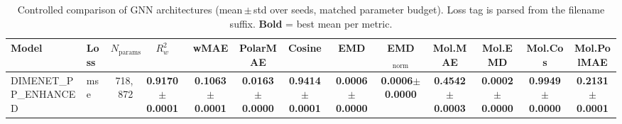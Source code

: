 \begin{table}[ht]
\centering
\caption{Controlled comparison of GNN architectures (mean\,$\pm$\,std over seeds, matched parameter budget). Loss tag is parsed from the filename suffix. \textbf{Bold} = best mean per metric.}
\label{tab:benchmark}
\small
\begin{tabular}{l l r c c c c c c c c c c }
\toprule
Model & Loss & $N_{\text{params}}$ & $R^2_w$ & wMAE & PolarMAE & Cosine & EMD & EMD$_\mathrm{norm}$ & Mol.MAE & Mol.EMD & Mol.Cos & Mol.PolMAE \\
\midrule
DIMENET_PP_ENHANCED & mse & 718,872 & \textbf{0.9170$\pm$0.0001} & \textbf{0.1063$\pm$0.0001} & \textbf{0.0163$\pm$0.0000} & \textbf{0.9414$\pm$0.0001} & \textbf{0.0006$\pm$0.0000} & \textbf{0.0006$\pm$0.0000} & \textbf{0.4542$\pm$0.0003} & \textbf{0.0002$\pm$0.0000} & \textbf{0.9949$\pm$0.0000} & \textbf{0.2131$\pm$0.0001} \\
\bottomrule
\end{tabular}
\end{table}
